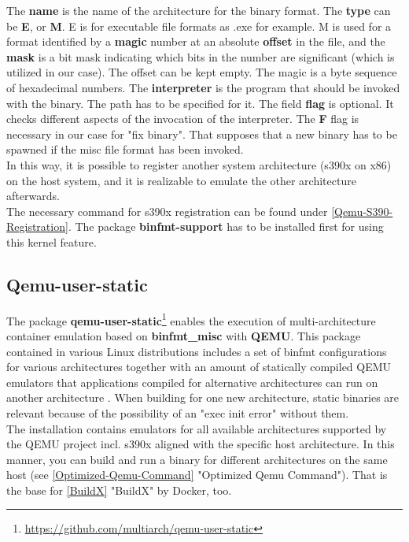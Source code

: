 The \textbf{name} is the name of the architecture for the binary format. The \textbf{type} can be \textbf{E}, or \textbf{M}. E is for executable file formats as .exe for example. M is used for a format identified by a \textbf{magic} number at an absolute \textbf{offset} in the file, and the \textbf{mask} is a bit mask indicating which bits in the number are significant\cite{Slackware2020} (which is utilized in our case). 
The offset can be kept empty. The magic is a byte sequence of hexadecimal numbers. The \textbf{interpreter} is the program that should be invoked with the binary\cite{Guenther2020}. 
The path has to be specified for it. The field \textbf{flag} is optional. It checks different aspects of the invocation of the interpreter. The \textbf{F} flag is necessary in our case for "fix binary". 
That supposes that a new binary has to be spawned if the misc file format has been invoked.\\
In this way, it is possible to register another system architecture (s390x on x86) on the host system, and it is realizable to emulate the other architecture afterwards. \\
The necessary command for s390x registration can be found under \ref{Qemu-S390-Registration}.
The package \textbf{binfmt-support} has to be installed first for using this kernel feature. 

\subsection{Qemu-user-static}\label{qemu-user-static}

The package \textbf{qemu-user-static}\footnote{\url{https://github.com/multiarch/qemu-user-static}} enables the execution of multi-architecture container emulation based on \textbf{binfmt\_misc} with \textbf{QEMU}. This package contained in various Linux distributions includes a set of binfmt configurations for various architectures together with an amount of statically compiled \gls{QEMU} emulators that applications compiled for alternative architectures can run on another architecture \cite{Yang2019}. When building for one new architecture, static binaries are relevant because of the possibility of an "exec init error" without them. \\
The installation contains emulators for all available architectures supported by the \gls{QEMU} project incl. s390x aligned with the specific host architecture. In this manner, you can build and run a binary for different architectures on the same host (see \ref{Optimized-Qemu-Command} "Optimized Qemu Command"). That is the base for \ref{BuildX} "BuildX" by Docker, too.

